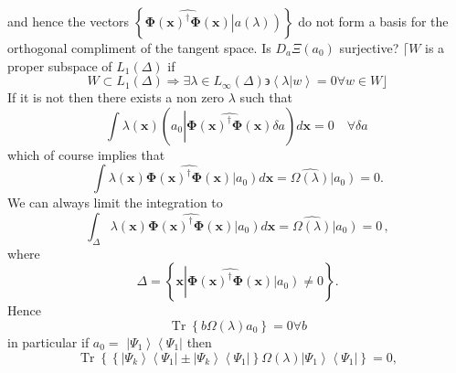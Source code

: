 \documentclass[aps,preprint]{revtex4}%
\begin{document}
and hence the vectors $\left\{  \widehat{\mathbf{\Phi}\left(  \mathbf{x}%
\right)  ^{\dagger}\mathbf{\Phi}\left(  \mathbf{x}\right)  }\left\vert
\overset{}{a\left(  \lambda\right)  }\right)  \right\}  $ do not form a basis
for the orthogonal compliment of the tangent space. Is $D_{a}\Xi\left(
a_{0}\right)  $ surjective? $\lceil W$ is a proper subspace of $L_{1}\left(
\Delta\right)  $ if
\begin{equation}
W\subset L_{1}\left(  \Delta\right)  \Rightarrow\exists\lambda\in L_{\infty
}\left(  \Delta\right)  \backepsilon\left\langle \left.  \lambda\right\vert
w\right\rangle =0\forall w\in W\rfloor
\end{equation}
If it is not then there exists a non zero $\lambda$ such that
\begin{equation}
\int\lambda\left(  \mathbf{x}\right)  \left(  a_{0}\left\vert \widehat
{\mathbf{\Phi}\left(  \mathbf{x}\right)  ^{\dagger}\mathbf{\Phi}\left(
\mathbf{x}\right)  }\right.  \delta a\right)  d\mathbf{x}=0\quad\forall\delta
a\,
\end{equation}
which of course implies that
\begin{equation}
\int\lambda\left(  \mathbf{x}\right)  \widehat{\mathbf{\Phi}\left(
\mathbf{x}\right)  ^{\dagger}\mathbf{\Phi}\left(  \mathbf{x}\right)
}\left\vert \overset{}{a_{0}}\right)  d\mathbf{x}=\widehat{\Omega\left(
\lambda\right)  }\left\vert \overset{}{a_{0}}\right)  =0.
\end{equation}
We can always limit the integration to
\begin{equation}
\int_{\Delta}\lambda\left(  \mathbf{x}\right)  \widehat{\mathbf{\Phi}\left(
\mathbf{x}\right)  ^{\dagger}\mathbf{\Phi}\left(  \mathbf{x}\right)
}\left\vert \overset{}{a_{0}}\right)  d\mathbf{x}=\widehat{\Omega\left(
\lambda\right)  }\left\vert \overset{}{a_{0}}\right)  =0\,,
\end{equation}
where
\begin{equation}
\Delta=\left\{  \mathbf{x}\left\vert \widehat{\mathbf{\Phi}\left(
\mathbf{x}\right)  ^{\dagger}\mathbf{\Phi}\left(  \mathbf{x}\right)
}\left\vert \overset{}{a_{0}}\right)  \neq0\right.  \right\}  .
\end{equation}
Hence
\begin{equation}
\operatorname{Tr}\left\{  b\Omega\left(  \lambda\right)  a_{0}\right\}
=0\forall b
\end{equation}
in particular if $a_{0}=$ $\left\vert \Psi_{1}\right\rangle \left\langle
\Psi_{1}\right\vert $ then
\begin{equation}
\operatorname{Tr}\left\{  \left\{  \left\vert \Psi_{k}\right\rangle
\left\langle \Psi_{1}\right\vert \pm\left\vert \Psi_{k}\right\rangle
\left\langle \Psi_{1}\right\vert \right\}  \Omega\left(  \lambda\right)
\left\vert \Psi_{1}\right\rangle \left\langle \Psi_{1}\right\vert \right\}
=0,
\end{equation}
\end{document}
